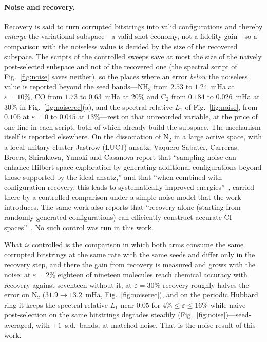 \paragraph{Noise and recovery.} Recovery is said to turn corrupted bitstrings into valid
configurations and thereby \emph{enlarge} the variational subspace---a valid-shot economy, not a
fidelity gain---so a comparison with the noiseless value is decided by the size of the recovered
subspace. The scripts of the controlled sweeps save at most the size of the naively post-selected
subspace and not of the recovered one (the spectral script of Fig.~\ref{fig:noise} saves neither), so
the places where an error \emph{below} the noiseless value is reported beyond the seed
bands---$\mathrm{NH_3}$ from $2.53$ to $1.24$~mHa at $\varepsilon=10\%$, CO from $1.73$ to $0.63$~mHa
at $20\%$ and $\mathrm{C_2}$ from $0.184$ to $0.026$~mHa at $30\%$ in Fig.~\ref{fig:noiserec}(a), and
the spectral relative $L_1$ of Fig.~\ref{fig:noise}, from $0.105$ at $\varepsilon=0$ to $0.045$ at
$13\%$---rest on that unrecorded variable, at the price of one line in each script, both of which
already build the subspace.
The mechanism itself is reported elsewhere. On the dissociation of
$\mathrm{N_2}$ in a large active space, with a local unitary cluster-Jastrow (LUCJ) ansatz,
Vaquero-Sabater, Carreras, Broers, Shirakawa, Yunoki and Casanova report that ``sampling noise can
enhance Hilbert-space exploration by generating additional configurations beyond those supported by
the ideal ansatz,'' and that ``when combined with configuration recovery, this leads to systematically
improved energies''~\cite{vaquero2026}, carried there by a controlled comparison under a simple noise model that the work introduces. The same work also reports that ``recovery alone (starting from randomly generated configurations) can efficiently construct accurate CI spaces''~\cite{vaquero2026}. No such control was run in this work.

What \emph{is} controlled is the comparison in which both arms consume the same corrupted bitstrings at
the same rate with the same seeds and differ only in the recovery step, and there the gain from
recovery is measured and grows with the noise: at $\varepsilon=2\%$ eighteen of nineteen molecules
reach chemical accuracy with recovery against seventeen without it, at $\varepsilon=30\%$ recovery
roughly halves the error on $\mathrm{N_2}$ ($31.9\to13.2$~mHa, Fig.~\ref{fig:noiserec}), and on the
periodic Hubbard ring it keeps the spectral relative $L_1$ near $0.05$ for $4\%\le\varepsilon\le16\%$
while naive post-selection on the same bitstrings degrades steadily
(Fig.~\ref{fig:noise})---seed-averaged, with $\pm1$~s.d.\ bands, at matched noise. That is the noise
result of this work.

